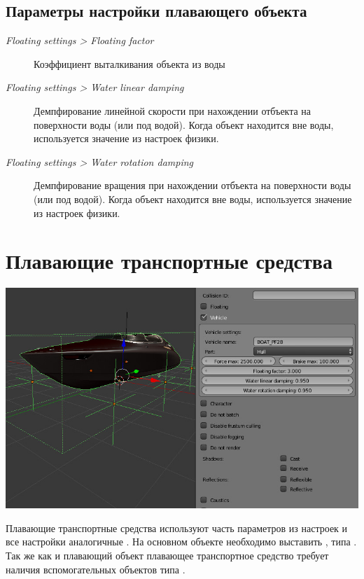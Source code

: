 \documentclass[a4paper,12pt,oneside]{sphinxmanual}
\begin{document}
\subsection{Параметры настройки плавающего объекта}
\label{physics:id8}\begin{description}
\item[{\emph{Floating settings \textgreater{} Floating factor}}] \leavevmode
Коэффициент выталкивания объекта из воды

\item[{\emph{Floating settings \textgreater{} Water linear damping}}] \leavevmode
Демпфирование линейной скорости при нахождении отбъекта на поверхности воды (или под водой). Когда объект находится вне воды, используется значение из настроек физики.

\item[{\emph{Floating settings \textgreater{} Water rotation damping}}] \leavevmode
Демпфирование вращения при нахождении отбъекта на поверхности воды (или под водой). Когда объект находится вне воды, используется значение из настроек физики.

\end{description}


\section{Плавающие транспортные средства}
\label{physics:id9}
\includegraphics[width=1.000\linewidth]{physics_boat.jpg}

\begin{DUlineblock}{0em}
\item[] 
\end{DUlineblock}

Плавающие транспортные средства используют часть параметров из настроек  и все настройки аналогичные . На основном объекте необходимо выставить , типа . Так же как и плавающий объект плавающее транспортное средство требует наличия вспомогательных объектов типа .
\end{document}
